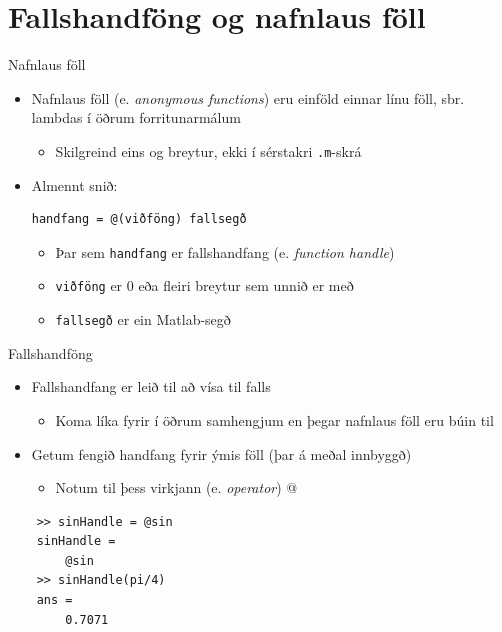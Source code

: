 \documentclass{beamer}
\begin{document}
\section{Fallshandföng og nafnlaus föll}

\begin{frame}[fragile]{Nafnlaus föll}
    \begin{itemize}
        \item Nafnlaus föll (e. \emph{anonymous functions}) eru einföld einnar línu föll, sbr. lambdas í öðrum forritunarmálum
         \begin{itemize}
            \item Skilgreind eins og breytur, ekki í sérstakri \texttt{.m}-skrá
         \end{itemize}
        \item Almennt snið:
\begin{verbatim}
handfang = @(viðföng) fallsegð
\end{verbatim}
        \begin{itemize}
            \item Þar sem \texttt{handfang} er fallshandfang (e. \emph{function handle})
            \item \texttt{viðföng} er 0 eða fleiri breytur sem unnið er með
            \item \texttt{fallsegð} er ein Matlab-segð
        \end{itemize}
    \end{itemize}
\end{frame}

\begin{frame}[fragile]{Fallshandföng}
\begin{itemize}
    \item Fallshandfang er leið til að vísa til falls
    \begin{itemize}
        \item Koma líka fyrir í öðrum samhengjum en þegar nafnlaus föll eru búin til
    \end{itemize}
    \item Getum fengið handfang fyrir ýmis föll (þar á meðal innbyggð)
    \begin{itemize}
        \item Notum til þess virkjann (e. \emph{operator}) @
    \end{itemize}
\end{itemize}
\begin{verbatim}
    >> sinHandle = @sin
    sinHandle = 
        @sin
    >> sinHandle(pi/4)
    ans =
        0.7071
\end{verbatim}
\end{frame}
\end{document}
